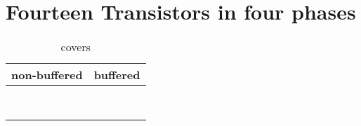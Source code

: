\section{Fourteen Transistors in four phases}

\begin{table}[ht]
\centering
\caption*{covers}

\begin{tabular}{cc}
    \toprule
    non-buffered & buffered \\
    \midrule

    \nameref{cell:AOAAOI2113} & \nameref{cell:AOAAO2113} \\
    \nameref{cell:OAOOAI2113} & \nameref{cell:OAOOA2113} \\
    \nameref{cell:AOOAAOI2122} & \nameref{cell:AAOAAO2122} \\
    \nameref{cell:OAAOOAI2122} & \nameref{cell:OOAOOA2122} \\
    \nameref{cell:AAOAAOI2212} & \nameref{cell:AAOAAO2212} \\
    \nameref{cell:OOAOOAI2212} & \nameref{cell:OOAOOA2212} \\
    \nameref{cell:AAOOAOI2221} & \nameref{cell:AAOOAO2221} \\
    \nameref{cell:OOAAOAI2221} & \nameref{cell:OOAAOA2221}

\end{tabular}

\end{table}

